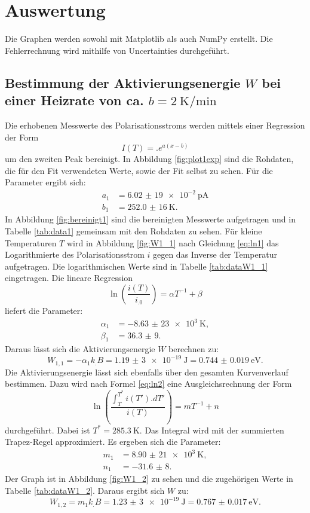 \section{Auswertung}
\label{sec:Auswertung}

Die Graphen werden sowohl mit Matplotlib \cite{matplotlib} als auch NumPy \cite{numpy} erstellt. Die Fehlerrechnung wird mithilfe von Uncertainties \cite{uncertainties} durchgeführt.

\subsection{Bestimmung der Aktivierungsenergie $W$ bei einer Heizrate von ca. $b=\SI{2}{\kelvin\per\minute}$}

Die erhobenen Messwerte des Polarisationsstroms werden mittels einer Regression der Form
\begin{equation}
I(T)=.e^{a(x-b)} \label{eq:reg1}
\end{equation}
um den zweiten Peak bereinigt. In Abbildung \ref{fig:plot1exp} sind die Rohdaten, die für den Fit verwendeten Werte, sowie der Fit selbst zu sehen.
Für die Parameter ergibt sich:
\begin{align*}
a_1&=\SI{6,02(19)e-2}{\pico\ampere}\\
b_1&=\SI{252,0(16)}{\kelvin}\text{.}
\end{align*}
In Abbildung \ref{fig:bereinigt1} sind die bereinigten Messwerte aufgetragen und in Tabelle \ref{tab:data1} gemeinsam mit den Rohdaten zu sehen.
Für kleine Temperaturen $T$ wird in Abbildung \ref{fig:W1_1} nach Gleichung \eqref{eq:ln1} das Logarithmierte des Polarisationsstrom $i$ gegen das Inverse der Temperatur aufgetragen. Die logarithmischen Werte sind in Tabelle \ref{tab:dataW1_1} eingetragen.
Die lineare Regression
\begin{equation}
\ln\left(\frac{i(T)}{i_.0}\right)=\alpha T^{-1}+\beta \label{eq:reg2}
\end{equation}
liefert die Parameter:
\begin{align*}
\alpha_1&=\SI{-8,63(23)e3}{\kelvin},\\
\beta_1 &= \num{36,3(9)}\text{.}
\end{align*}
Daraus lässt sich die Aktivierungsenergie $W$ berechnen zu:
\[
W_{1,1} = -\alpha_1 k_.B =\SI{1,19(3)e-19}{\joule}=\SI{0.744(19)}{\electronvolt}\text{.}
\]
Die Aktivierungsenergie lässt sich ebenfalls über den gesamten Kurvenverlauf bestimmen. Dazu wird nach Formel \eqref{eq:ln2} eine Ausgleichsrechnung der Form 
\begin{equation}
\ln\left(\frac{\int_T^{T^*} i(T').dT'}{i(T)}\right) = mT^{-1}+n \label{eq:reg3}
\end{equation}
durchgeführt. Dabei ist $T^*=\SI{285,3}{\kelvin}$. Das Integral wird mit der summierten Trapez-Regel approximiert. Es ergeben sich die Parameter:
\begin{align*}
m_1&=\SI{8,90(21)e3}{\kelvin},\\
n_1&=\num{-31,6(8)}\text{.}
\end{align*}
Der Graph ist in Abbildung \ref{fig:W1_2} zu sehen und die zugehörigen Werte in Tabelle \ref{tab:dataW1_2}.
Daraus ergibt sich $W$ zu:
\[
W_{1,2} = m_1 k_.B =\SI{1,23(3)e-19}{\joule}=\SI{0.767(17)}{\electronvolt}\text{.}
\]

